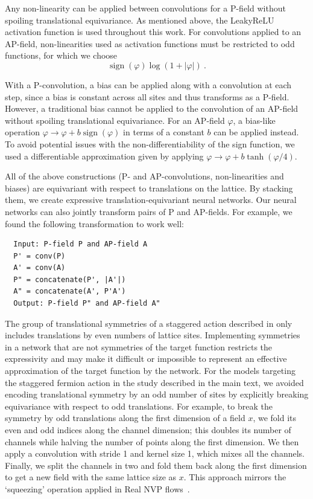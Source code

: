 \documentclass[aps,prd,twocolumn,nofootinbib,superscriptaddress,preprintnumbers]{revtex4-1}
\DeclareMathOperator{\sign}{sign}
\begin{document}
Any non-linearity can be applied between convolutions for a P-field without spoiling translational equivariance. As mentioned above, the LeakyReLU activation function is used throughout this work. For convolutions applied to an AP-field, non-linearities used as activation functions must be restricted to odd functions, for which we choose
%
\begin{equation}
    \sign(\varphi)\log(1 + |\varphi|) \ .
\end{equation}

With a P-convolution, a bias can be applied along with a convolution at each step, since a bias is constant across all sites and thus transforms as a P-field. However, a traditional bias cannot be applied to the convolution of an AP-field without spoiling translational equivariance. For an AP-field $\varphi$, a bias-like operation $\varphi \rightarrow \varphi + b \sign(\varphi)$ in terms of a constant $b$ can be applied instead. To avoid potential issues with the non-differentiability of the sign function, we used a differentiable approximation given by applying $\varphi \rightarrow \varphi + b \tanh(\varphi/4)$.

All of the above constructions (P- and AP-convolutions, non-linearities and biases) are equivariant with respect to translations on the lattice. By stacking them, we create expressive translation-equivariant neural networks. Our neural networks can also jointly transform pairs of P and AP-fields. For example, we found the following transformation to work well:
%
\begin{verbatim}
  Input: P-field P and AP-field A
  P' = conv(P)
  A' = conv(A)
  P" = concatenate(P', |A'|)
  A" = concatenate(A', P'A')
  Output: P-field P" and AP-field A"
\end{verbatim}

The group of translational symmetries of a staggered action described in  only includes translations by even numbers of lattice sites. Implementing symmetries in a network that are not symmetries of the target function restricts the expressivity and may make it difficult or impossible to represent an effective approximation of the target function by the network. For the models targeting the staggered fermion action in the study described in the main text, we avoided encoding translational symmetry by an odd number of sites by explicitly breaking equivariance with respect to odd translations. For example, to break the symmetry by odd translations along the first dimension of a field $x$, we fold its even and odd indices along the channel dimension; this doubles its number of channels while halving the number of points along the first dimension. We then apply a convolution with stride 1 and kernel size 1, which mixes all the channels. Finally, we split the channels in two and fold them back along the first dimension to get a new field with the same lattice size as $x$. This approach mirrors the `squeezing' operation applied in Real NVP flows~\cite{dinh2017density}.
\end{document}
